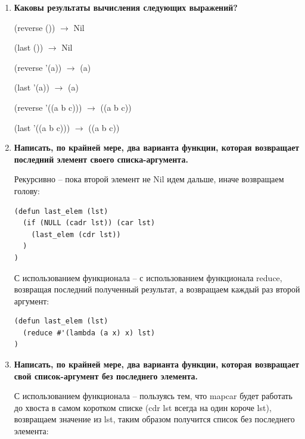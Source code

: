 \documentclass[a4paper,14pt]{extreport} %
\begin{document}
\begin{enumerate}
(cons lst1 lst2) $\to$ ((1 2 3) 4 5)

(list lst1 lst2) $\to$ ((1 2 3) (4 5))

(append lst1 lst2) $\to$ (1 2 3 4 5)

CONS -- позволяет создавать списки (возвращает бинарную ячейку (точечная пара, список), расставляя указатели, обязательно 2 аргумента). 

APPEND -- функция двух аргументов x и y, сцепляющая два списка в один.

LIST -- создает столько списковых ячеек, сколько аргументов (всегда возвращает список).

\item \textbf{Каковы результаты вычисления следующих выражений?}

(reverse ()) $\to$ Nil

(last ()) $\to$ Nil

(reverse '(a)) $\to$ (a)

(last '(a)) $\to$ (a)

(reverse '((a b c))) $\to$ ((a b c))

(last '((a b c))) $\to$ ((a b c))

\item \textbf{Написать, по крайней мере, два варианта функции, которая возвращает последний элемент своего списка-аргумента.}

Рекурсивно -- пока второй элемент не Nil идем дальше, иначе возвращаем голову:

\begin{lstlisting}
(defun last_elem (lst)
  (if (NULL (cadr lst)) (car lst) 
    (last_elem (cdr lst))
  ) 
)
\end{lstlisting}

С использованием функционала -- с использованием функционала reduce, возвращая последний полученный результат, а возвращаем каждый раз второй аргумент:

\begin{lstlisting}
(defun last_elem (lst)
  (reduce #'(lambda (a x) x) lst)
)
\end{lstlisting}

\item \textbf{Написать, по крайней мере, два варианта функции, которая возвращает свой список-аргумент без последнего элемента.}

С использованием функционала -- пользуясь тем, что mapcar будет работать до хвоста в самом коротком списке (cdr lst всегда на один короче lst), возвращаем значение из lst, таким образом получится список без последнего элемента:


\end{enumerate}
\end{document}
